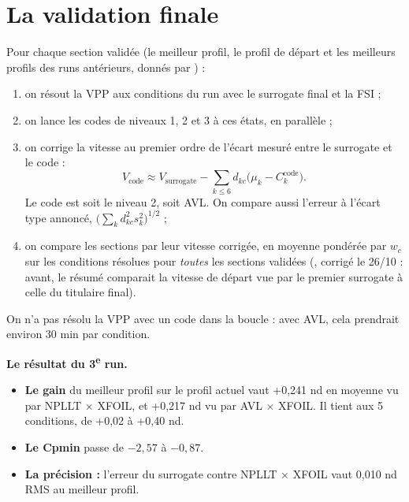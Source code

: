 \documentclass[10pt,a4paper]{article}
\begin{document}
\section{La validation finale}
Pour chaque section validée (le meilleur profil, le profil de départ et les meilleurs profils des runs
antérieurs, donnés par ) :
\begin{enumerate}
  \item on résout la VPP aux conditions du run avec le surrogate final et la FSI ;
  \item on lance les codes de niveaux 1, 2 et 3 à ces états, en parallèle ;
  \item on corrige la vitesse au premier ordre de l'écart mesuré entre le surrogate et le code :
        \[
          V_{\text{code}}\approx V_{\text{surrogate}}-\sum_{k\le6} d_{kc}\big(\mu_k-C_k^{\text{code}}\big).
        \]
        Le code est soit le niveau 2, soit AVL. On compare aussi l'erreur à l'écart type annoncé,
        $\big(\sum_k d_{kc}^2 s_k^2\big)^{1/2}$ ;
  \item on compare les sections par leur vitesse corrigée, en moyenne pondérée par $w_c$ sur les conditions
        résolues pour \emph{toutes} les sections validées (, corrigé le 26/10 :
        avant, le résumé comparait la vitesse de départ vue par le premier surrogate à celle du titulaire
        final).
\end{enumerate}
On n'a pas résolu la VPP avec un code dans la boucle : avec AVL, cela prendrait environ 30 min par condition.

\textbf{Le résultat du 3\textsuperscript{e} run.}
\begin{itemize}
  \item \textbf{Le gain} du meilleur profil sur le profil actuel vaut +0,241 nd en moyenne vu par
        NPLLT × XFOIL, et +0,217 nd vu par AVL × XFOIL. Il tient aux 5 conditions, de +0,02 à +0,40 nd.
  \item \textbf{Le Cpmin} passe de $-2{,}57$ à $-0{,}87$.
  \item \textbf{La précision :} l'erreur du surrogate contre NPLLT × XFOIL vaut 0,010 nd RMS au meilleur
        profil.
\end{itemize}
\end{document}
